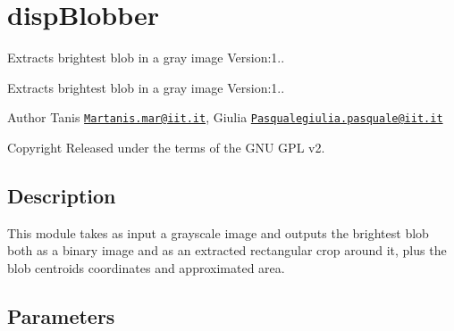 \section{disp\+Blobber}
\label{group__dispBlobber}


Extracts brightest blob in a gray image Version\+:1..  


Extracts brightest blob in a gray image Version\+:1.. 

\begin{DoxyAuthor}{Author}
Tanis \href{mailto:Martanis.mar@iit.it}{\tt Martanis.\+mar@iit.\+it}, Giulia \href{mailto:Pasqualegiulia.pasquale@iit.it}{\tt Pasqualegiulia.\+pasquale@iit.\+it} ~\newline
 
\end{DoxyAuthor}
\begin{DoxyCopyright}{Copyright}
Released under the terms of the G\+NU G\+PL v2. 
\end{DoxyCopyright}
\hypertarget{group__lbpExtract_intro_sec}{}\subsection{Description}\label{group__lbpExtract_intro_sec}
This module takes as input a grayscale image and outputs the brightest blob both as a binary image and as an extracted rectangular crop around it, plus the blob centroid\textquotesingle{}s coordinates and approximated area.\hypertarget{group__lbpExtract_parameters_sec}{}\subsection{Parameters}\label{group__lbpExtract_parameters_sec}

